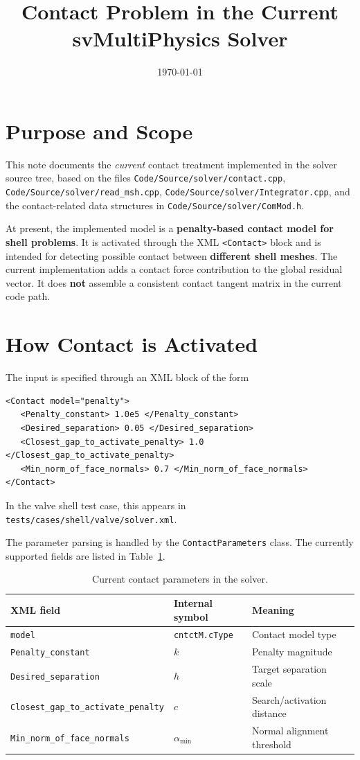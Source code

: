 \documentclass[11pt]{article}
\title{Contact Problem in the Current svMultiPhysics Solver}
\author{}
\date{\today}
\begin{document}
\maketitle

\section{Purpose and Scope}

This note documents the \emph{current} contact treatment implemented in the solver source tree, based on the files
\texttt{Code/Source/solver/contact.cpp},
\texttt{Code/Source/solver/read\_msh.cpp},
\texttt{Code/Source/solver/Integrator.cpp},
and the contact-related data structures in
\texttt{Code/Source/solver/ComMod.h}.

At present, the implemented model is a \textbf{penalty-based contact model for shell problems}. It is activated through the XML \texttt{<Contact>} block and is intended for detecting possible contact between \textbf{different shell meshes}. The current implementation adds a contact force contribution to the global residual vector. It does \textbf{not} assemble a consistent contact tangent matrix in the current code path.

\section{How Contact is Activated}

The input is specified through an XML block of the form
\begin{verbatim}
<Contact model="penalty">
   <Penalty_constant> 1.0e5 </Penalty_constant>
   <Desired_separation> 0.05 </Desired_separation>
   <Closest_gap_to_activate_penalty> 1.0 </Closest_gap_to_activate_penalty>
   <Min_norm_of_face_normals> 0.7 </Min_norm_of_face_normals>
</Contact>
\end{verbatim}

In the valve shell test case, this appears in
\texttt{tests/cases/shell/valve/solver.xml}.

The parameter parsing is handled by the \texttt{ContactParameters} class. The currently supported fields are listed in Table~\ref{tab:params}.

\begin{table}[h]
\centering
\begin{tabular}{lll}
\toprule
XML field & Internal symbol & Meaning \\
\midrule
\texttt{model} & \texttt{cntctM.cType} & Contact model type \\
\texttt{Penalty\_constant} & $k$ & Penalty magnitude \\
\texttt{Desired\_separation} & $h$ & Target separation scale \\
\texttt{Closest\_gap\_to\_activate\_penalty} & $c$ & Search/activation distance \\
\texttt{Min\_norm\_of\_face\_normals} & $\alpha_{\min}$ & Normal alignment threshold \\
\bottomrule
\end{tabular}
\caption{Current contact parameters in the solver.}
\label{tab:params}
\end{table}
\end{document}
